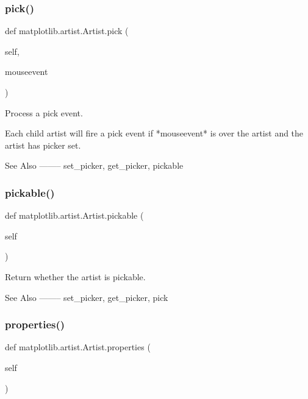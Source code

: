 \subsubsection{\texorpdfstring{pick()}{pick()}}
{\footnotesize\ttfamily def matplotlib.\+artist.\+Artist.\+pick (\begin{DoxyParamCaption}\item[{}]{self,  }\item[{}]{mouseevent }\end{DoxyParamCaption})}

\begin{DoxyVerb}Process a pick event.

Each child artist will fire a pick event if *mouseevent* is over
the artist and the artist has picker set.

See Also
--------
set_picker, get_picker, pickable
\end{DoxyVerb}
 \mbox{\label{classmatplotlib_1_1artist_1_1Artist_ae9bba514ddae38443dce4ad612568489}} 
\subsubsection{\texorpdfstring{pickable()}{pickable()}}
{\footnotesize\ttfamily def matplotlib.\+artist.\+Artist.\+pickable (\begin{DoxyParamCaption}\item[{}]{self }\end{DoxyParamCaption})}

\begin{DoxyVerb}Return whether the artist is pickable.

See Also
--------
set_picker, get_picker, pick
\end{DoxyVerb}
 \mbox{\label{classmatplotlib_1_1artist_1_1Artist_a19c56a548db54fb79df0951d358d8e9d}} 
\subsubsection{\texorpdfstring{properties()}{properties()}}
{\footnotesize\ttfamily def matplotlib.\+artist.\+Artist.\+properties (\begin{DoxyParamCaption}\item[{}]{self }\end{DoxyParamCaption})}


